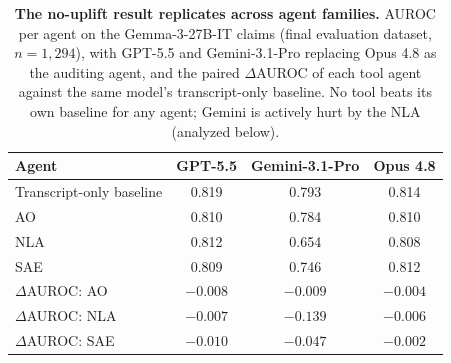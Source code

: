\begin{table}[h]
\centering
\begin{tabular}{lccc}
\toprule
Agent & GPT-5.5 & Gemini-3.1-Pro & Opus 4.8 \\
\midrule
Transcript-only baseline & 0.819 & 0.793 & 0.814 \\
AO & 0.810 & 0.784 & 0.810 \\
NLA & 0.812 & 0.654 & 0.808 \\
SAE & 0.809 & 0.746 & 0.812 \\
\midrule
$\Delta$AUROC: AO & $-0.008$ & $-0.009$ & $-0.004$ \\
$\Delta$AUROC: NLA & $-0.007$ & $-0.139$ & $-0.006$ \\
$\Delta$AUROC: SAE & $-0.010$ & $-0.047$ & $-0.002$ \\
\bottomrule
\end{tabular}
\caption{\textbf{The no-uplift result replicates across agent families.} AUROC per agent on the Gemma-3-27B-IT claims (final evaluation dataset, $n = 1{,}294$), with GPT-5.5 and Gemini-3.1-Pro replacing Opus 4.8 as the auditing agent, and the paired $\Delta$AUROC of each tool agent against the same model's transcript-only baseline. No tool beats its own baseline for any agent; Gemini is actively hurt by the NLA (analyzed below).}
\label{tab:crossmodel}
\end{table}
